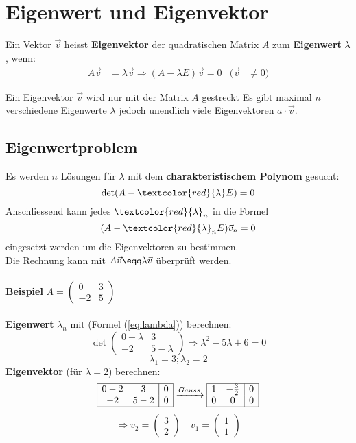 \section{Eigenwert und Eigenvektor}
Ein Vektor $\vec{v}$ heisst \textbf{Eigenvektor} der quadratischen Matrix $A$ zum \textbf{Eigenwert} $\lambda$, wenn: 
\begin{align*}
	A\vec{v} &= \lambda\vec{v} \Rightarrow (A - \lambda E)\vec{v} = 0  & (\vec{v} &\neq 0)
\end{align*}

\noindent
Ein Eigenvektor $\vec{v}$ wird nur mit der Matrix $A$ gestreckt Es gibt maximal $n$ verschiedene Eigenwerte $\lambda$ jedoch unendlich viele Eigenvektoren $a \cdot \vec{v}$.

\subsection{Eigenwertproblem}\label{charakteristischempolynom}
Es werden $n$ Lösungen für $\lambda$ mit dem \textbf{charakteristischem Polynom} gesucht:
\begin{equation}\label{eq:lambda}
	\det(A - \textcolor{red}{\lambda} E) = 0
\end{equation} Anschliessend kann jedes $\textcolor{red}{\lambda}_n$ in die Formel 
\begin{equation}
	(A - \textcolor{red}{\lambda}_n E)\vec{v}_n = 0
\end{equation} eingesetzt werden um die Eigenvektoren zu bestimmen. \\Die Rechnung kann mit $A\vec{v} \eqq \lambda\vec{v}$ überprüft werden.
\\ \\
\noindent\textbf{Beispiel}
$A = \begin{pmatrix} 0 & 3 \\ -2 & 5 \end{pmatrix}$
\\ \\
\noindent \textbf{Eigenwert} $\lambda_n$ mit (Formel (\ref{eq:lambda})) berechnen:
\[\det\begin{pmatrix}
	0 - \lambda & 3 \\
	-2 & 5 - \lambda
\end{pmatrix} \Rightarrow \lambda^2 - 5\lambda + 6 = 0\]
\[{\scriptstyle \lambda_1 = 3; \lambda_2 = 2}\]
\label{eigenvektor}
\noindent \textbf{Eigenvektor} (für $\lambda = 2$) berechnen:
\[
\begin{array}{|cc|c|}
	\hline
	0 - 2 & 3 & 0 \\
	-2 & 5 - 2 & 0 \\
	\hline
\end{array}
\xrightarrow{Gauss}
\begin{array}{|cc|c|}
	\hline
	1 & -\frac{3}{2} & 0 \\
	0 & 0 & 0 \\
	\hline
\end{array}
\]
\[\Rightarrow v_2 = \begin{pmatrix} 3 \\ 2 \end{pmatrix} \quad v_1 = \begin{pmatrix} 1 \\ 1 \end{pmatrix}\]


